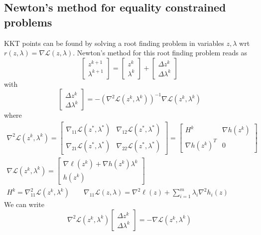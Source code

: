 \documentclass[openany]{book}
\theoremstyle{definition}
\theoremstyle{remark}
\begin{document}
\subsection{Newton's method for equality constrained problems}
KKT points can be found by solving a root finding problem in variables $z,\lambda$ wrt $r(z,\lambda)=\nabla \mathcal{L}(z,\lambda)$. Newton's method for this root finding problem reads as 
\[
    \begin{bmatrix}
        z^{k+1} \\ \lambda^{k+1}
        \end{bmatrix} = \begin{bmatrix}
        z^k \\ \lambda^k
        \end{bmatrix} + \begin{bmatrix}
        \Delta z^k \\ \Delta \lambda^k
    \end{bmatrix}
\]
with 
\[
    \begin{bmatrix}
        \Delta z^k \\ \Delta \lambda^k
    \end{bmatrix} = -(\nabla^2 \mathcal{L}(z^k,\lambda^k))^{-1}\nabla \mathcal{L}(z^k,\lambda^k)
\]
where 
\begin{gather*}
    \nabla^2\mathcal{L}(z^k,\lambda^k)= \begin{bmatrix}
        \nabla_{11} \mathcal{L}(z^*,\lambda^*) & \nabla_{12} \mathcal{L}(z^*,\lambda^*)\\
        \nabla_{21} \mathcal{L}(z^*,\lambda^*) & \nabla_{22} \mathcal{L}(z^*,\lambda^*)
        \end{bmatrix} = \begin{bmatrix}
        H^k & \nabla h(z^k) \\
        \nabla h(z^k)^T & 0
        \end{bmatrix} \\ \nabla \mathcal{L}(z^k,\lambda^k) = \begin{bmatrix}
        \nabla \ell(z^k)+\nabla h(z^k)\lambda^k \\ h(z^k)
    \end{bmatrix} \\
    H^k = \nabla_{11}^2 \mathcal{L}(z^k,\lambda^k) \qquad
    \nabla_{11}\mathcal{L}(z,\lambda) = \nabla^2 \ell(z) + \displaystyle\sum_{i=1}^{m}\lambda_i\nabla^2h_i(z)
\end{gather*}
We can write 
\[
    \nabla^2\mathcal{L}(z^k,\lambda^k)\begin{bmatrix}
        \Delta z^k \\ \Delta \lambda^k
    \end{bmatrix} = -\nabla \mathcal{L}(z^k,\lambda^k)
\]
\end{document}
